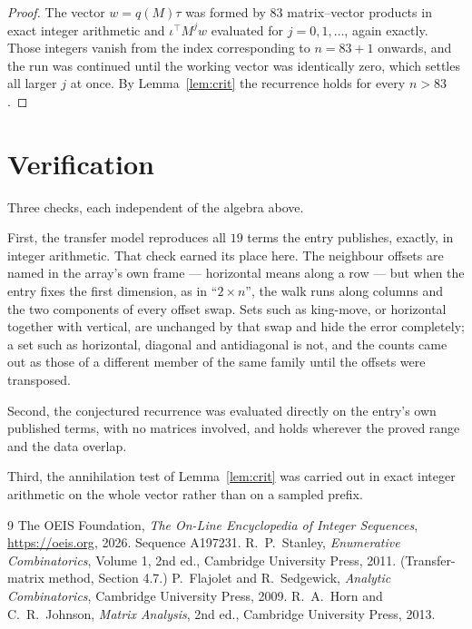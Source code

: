 \documentclass[11pt,a4paper]{article}
\theoremstyle{plain}
\theoremstyle{definition}
\begin{document}
\begin{proof}
The vector $w=q(M)\tau$ was formed by $83$ matrix--vector products in exact integer
arithmetic and $\iota^{\!\top}M^{j}w$ evaluated for $j=0,1,\dots$, again exactly. Those
integers vanish from the index corresponding to $n=83+1$ onwards, and the run was
continued until the working vector was identically zero, which settles all larger $j$ at once.
By Lemma~\ref{lem:crit} the recurrence holds for every $n>83$.
\end{proof}

\section{Verification}

Three checks, each independent of the algebra above.

First, the transfer model reproduces all $19$ terms the entry publishes, exactly, in
integer arithmetic. That check earned its place here. The neighbour offsets are named in the
array's own frame --- horizontal means along a row --- but when the entry fixes the first
dimension, as in ``$2\times n$'', the walk runs along columns and the two components of every
offset swap. Sets such as king-move, or horizontal together with vertical, are unchanged by
that swap and hide the error completely; a set such as horizontal, diagonal and antidiagonal
is not, and the counts came out as those of a different member of the same family until the
offsets were transposed.

Second, the conjectured recurrence was evaluated directly on the entry's own published terms,
with no matrices involved, and holds wherever the proved range and the data overlap.

Third, the annihilation test of Lemma~\ref{lem:crit} was carried out in exact integer
arithmetic on the whole vector rather than on a sampled prefix.

\begin{thebibliography}{9}
 The OEIS Foundation, \emph{The On-Line Encyclopedia of Integer
Sequences}, \url{https://oeis.org}, 2026. Sequence A197231.
 R.~P.~Stanley, \emph{Enumerative Combinatorics}, Volume 1, 2nd ed.,
Cambridge University Press, 2011. (Transfer-matrix method, Section 4.7.)
 P.~Flajolet and R.~Sedgewick, \emph{Analytic Combinatorics}, Cambridge
University Press, 2009.
 R.~A.~Horn and C.~R.~Johnson, \emph{Matrix Analysis}, 2nd ed., Cambridge
University Press, 2013.
\end{thebibliography}
\end{document}
